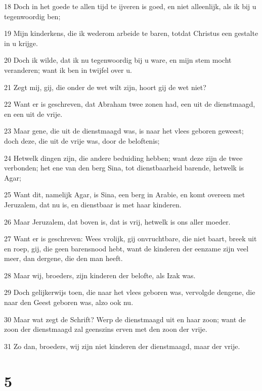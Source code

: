 \par 18 Doch in het goede te allen tijd te ijveren is goed, en niet alleenlijk, als ik bij u tegenwoordig ben;
\par 19 Mijn kinderkens, die ik wederom arbeide te baren, totdat Christus een gestalte in u krijge.
\par 20 Doch ik wilde, dat ik nu tegenwoordig bij u ware, en mijn stem mocht veranderen; want ik ben in twijfel over u.
\par 21 Zegt mij, gij, die onder de wet wilt zijn, hoort gij de wet niet?
\par 22 Want er is geschreven, dat Abraham twee zonen had, een uit de dienstmaagd, en een uit de vrije.
\par 23 Maar gene, die uit de dienstmaagd was, is naar het vlees geboren geweest; doch deze, die uit de vrije was, door de beloftenis;
\par 24 Hetwelk dingen zijn, die andere beduiding hebben; want deze zijn de twee verbonden; het ene van den berg Sina, tot dienstbaarheid barende, hetwelk is Agar;
\par 25 Want dit, namelijk Agar, is Sina, een berg in Arabie, en komt overeen met Jeruzalem, dat nu is, en dienstbaar is met haar kinderen.
\par 26 Maar Jeruzalem, dat boven is, dat is vrij, hetwelk is ons aller moeder.
\par 27 Want er is geschreven: Wees vrolijk, gij onvruchtbare, die niet baart, breek uit en roep, gij, die geen barensnood hebt, want de kinderen der eenzame zijn veel meer, dan dergene, die den man heeft.
\par 28 Maar wij, broeders, zijn kinderen der belofte, als Izak was.
\par 29 Doch gelijkerwijs toen, die naar het vlees geboren was, vervolgde dengene, die naar den Geest geboren was, alzo ook nu.
\par 30 Maar wat zegt de Schrift? Werp de dienstmaagd uit en haar zoon; want de zoon der dienstmaagd zal geenszins erven met den zoon der vrije.
\par 31 Zo dan, broeders, wij zijn niet kinderen der dienstmaagd, maar der vrije.

\chapter{5}

